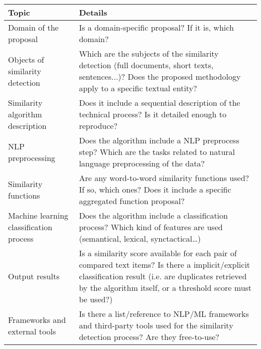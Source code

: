\begin{table}[h]
\begin{tabular}{|p{4cm}|p{10cm}|}
\hline
\textbf{Topic}                                   & \textbf{Details}                                                                                                                                                                                                              \\
\hline
Domain of the proposal                  & Is a domain-specific proposal? If it is, which domain?                                                                                                                                                               \\
\hline
Objects of similarity detection         & Which are the subjects of the similarity detection (full documents, short texts, sentences...)? Does the proposed methodology apply to a specific textual entity?                                                    \\
\hline
Similarity algorithm description        & Does it include a sequential description of the technical process? Is it detailed enough to reproduce?                                                                                                               \\
\hline
NLP preprocessing                       & Does the algorithm include a NLP preprocess step? Which are the tasks related to natural language preprocessing of the data?                                                                                         \\
\hline
Similarity functions                    & Are any word-to-word similarity functions used? If so, which ones? Does it include a specific aggregated function proposal?                                                                                          \\
\hline
Machine learning classification process & Does the algorithm include a classification process? Which kind of features are used (semantical, lexical, synctactical…)                                                                                            \\
\hline
Output results                          & Is a similarity score available for each pair of compared text items? Is there a implicit/explicit classification result (i.e. are duplicates retrieved by the algorithm itself, or a threshold score must be used?) \\
\hline
Frameworks and external tools           & Is there a list/reference to NLP/ML frameworks and third-party tools used for the similarity detection process? Are they free-to-use?                                                                                \\

\end{tabular}
\end{table}
